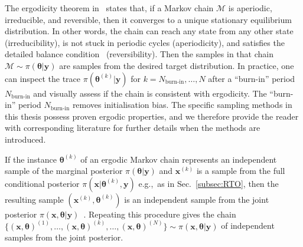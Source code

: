The ergodicity theorem in~\cite{tan2016LecNot} states that, if a Markov chain $\mathcal{M}$ is aperiodic, irreducible, and reversible, then it converges to a unique stationary equilibrium distribution.
In other words, the chain can reach any state from any other state (irreducibility), is not stuck in periodic cycles (aperiodicity), and satisfies the detailed balance condition~\cite{tan2016LecNot} (reversibility).
Then the samples in that chain $ \mathcal{M} \sim \pi( \bm{\theta} |  \bm{y})$ are samples from the desired target distribution.
In practice, one can inspect the trace $\pi(\bm{\theta}^{(k)} |  \bm{y})$ for $k = N_{\text{burn-in}}, \dots, N$ after a ``burn-in'' period $N_{\text{burn-in}}$ and visually assess if the chain is consistent with ergodicity.
The ``burn-in'' period $N_{\text{burn-in}}$ removes initialisation bias.
The specific sampling methods in this thesis possess proven ergodic properties, and we therefore provide the reader with corresponding literature for further details when the methods are introduced.


If the instance $\bm{\theta}^{(k)}$ of an ergodic Markov chain represents an independent sample of the marginal posterior $\pi(\bm{\theta} | \bm{y})$ and $\bm{x}^{(k)}$ is a sample from the full conditional posterior $ \pi(\bm{x}|   \bm{\theta}^{(k)}, \bm{y})$ e.g.,~as in Sec.~\ref{subsec:RTO}, then the resulting sample $(\bm{x}^{(k)}, \bm{\theta}^{(k)})$ is an independent sample from the joint posterior $\pi(\bm{x},   \bm{\theta} | \bm{y})$~\cite{fox2016fast,acosta2022markov}.
Repeating this procedure gives the chain $\{(\bm{x}, \bm{\theta})^{(1)},\dots, (\bm{x}, \bm{\theta})^{(k)} ,\dots, (\bm{x}, \bm{\theta})^{(N)} \} \sim \pi(\bm{x} ,  \bm{\theta} | \bm{y}) $ of independent samples from the joint posterior.

